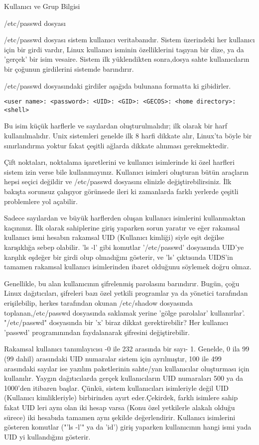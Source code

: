 \begin{section}{Kullanıcı ve Grup Bilgisi}
\begin{subsection}{/etc/passwd dosyası}

/etc/passwd dosyası sistem kullanıcı veritabanıdır. Sistem üzerindeki her kullanıcı için bir girdi vardır, Linux kullanıcı isminin özelliklerini taşıyan bir dize, ya da 'gerçek' bir isim vesaire. Sistem ilk yüklendikten sonra,dosya sahte kullanıcıların bir çoğunun girdilerini sistemde barındırır.

/etc/passwd dosyasındaki girdiler aşağıda bulunana formatta ki gibidirler.
\begin{verbatim}
<user name>: <password>: <UID>: <GID>: <GECOS>: <home directory>: <shell>
\end{verbatim}

Bu isim küçük harflerle ve sayılardan oluşturulmalıdır; ilk olarak bir harf kullanılmalıdır. Unix sistemleri genelde ilk 8 harfi dikkate alır, Linux'ta böyle bir sınırlandırma yoktur fakat çeşitli ağlarda dikkate alınması gerekmektedir.

Çift noktaları, noktalama işaretlerini ve kullanıcı isimlerinde ki özel harfleri sistem izin verse bile kullanmayınız. Kullanıcı isimleri oluşturan bütün araçların hepsi seçici değildir ve /etc/passwd dosyasını elinizle değiştirebilirsiniz. İlk bakışta sorunsuz çalışıyor görünsede ileri ki zamanlarda farklı yerlerde çeşitli problemlere yol açabilir.

Sadece sayılardan ve büyük harflerden oluşan kullanıcı isimlerini kullanmaktan kaçınınız. İlk olarak sahiplerine giriş yaparken sorun yaratır ve eğer rakamsal kullanıcı ismi hesabın rakamsal UID (Kullanıcı kimliği) siyle eşit değilse karışıklığa sebep olabilir. 'ls -l' gibi komutlar '/etc/passwd' dosyasında UID'ye karşılık eşdeğer bir girdi olup olmadığını gösterir, ve 'ls' çıktısında UIDS'in tamamen rakamsal kullanıcı isimlerinden ibaret olduğunu söylemek doğru olmaz.

Genellikle, bu alan kullanıcının şifrelenmiş parolasını barındırır. Bugün, çoğu Linux dağıtıcıları, şifreleri bazı özel yetkili programlar ya da yönetici tarafından erişilebilip, herkes tarafından okunan /etc/shadow dosyasında toplanan,/etc/passwd dosyasında saklamak yerine 'gölge parolalar' kullanırlar'. "/etc/passwd" dosyasında bir 'x' biraz dikkat gerektirebilir? Her kullanıcı 'passwd' programınından faydalanarak şifresini değiştirebilir.

Rakamsal kullanıcı tanımlayıcısı -0 ile 232 arasında bir sayı- 1. Genelde, 0 ila 99 (99 dahil) arasındaki UID numaralar sistem için ayrılmıştır, 100 ile 499 arasındaki sayılar ise yazılım paketlerinin sahte/yan kullanıcılar oluşturması için kullanılır. Yaygın dağıtıcılarda gerçek kullanıcıların UID numaraları 500 ya da 1000'den itibaren başlar. Çünkü, sistem kullanıcıları isimleriyle değil UID (Kullanıcı kimlikleriyle) birbirinden ayırt eder.Çekirdek, farklı isimlere sahip fakat UID leri aynı olan iki hesap varsa (Konu özel yetkilerle alakalı olduğu sürece) iki hesabıda tamamen aynı şekilde değerlendirir. Kullanıcı isimlerini gösteren komutlar ("'ls -l'" ya da 'id') giriş yaparken kullanıcının hangi ismi yada UID yi kullandığını gösterir.


\end{subsection}
\end{section}

